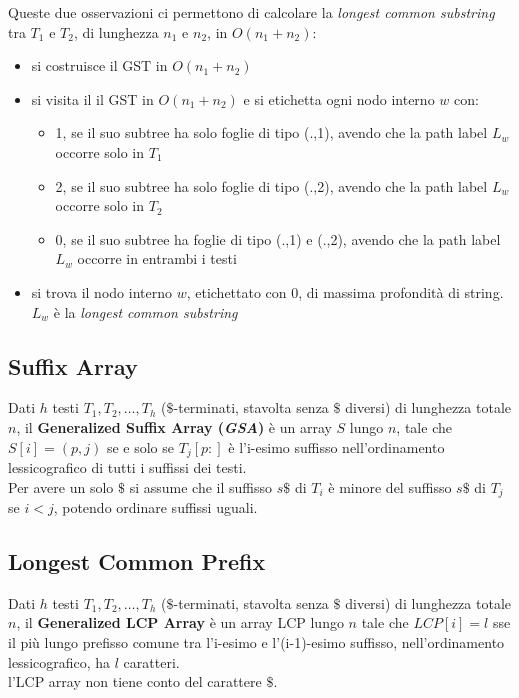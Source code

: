 \documentclass[a4paper,12pt, oneside]{book}
\begin{document}
Queste due osservazioni ci permettono di calcolare la \textit{longest common
  substring} tra $T_1$ e $T_2$, di lunghezza $n_1$ e $n_2$, in $O(n_1+n_2)$:
\begin{itemize}
  \item si costruisce il GST in $O(n_1+n_2)$
  \item si visita il il GST in $O(n_1+n_2)$ e si etichetta ogni nodo interno $w$
  con:
  \begin{itemize}
    \item 1, se il suo subtree ha solo foglie di tipo (.,1), avendo che la path
    label $L_w$ occorre solo in $T_1$
    \item 2, se il suo subtree ha solo foglie di tipo (.,2), avendo che la path
    label $L_w$ occorre solo in $T_2$ 
    \item 0, se il suo subtree ha foglie di tipo (.,1) e (.,2), avendo che la
    path label $L_w$ occorre in entrambi i testi
  \end{itemize}
  \item si trova il nodo interno $w$, etichettato con $0$, di massima profondità
  di string. $L_w$ è la \textit{longest common substring}
\end{itemize}
\subsection{Suffix Array}
\begin{definizione}
  Dati $h$ testi $ T_1,  T_2,  \ldots, T_h$ ($\$$-terminati, stavolta senza $\$$
  diversi) di lunghezza totale $n$, il
  \textbf{Generalized Suffix  Array (\textit{GSA})} è un array $S$ lungo $n$,
  tale che $S[i] = (p,j)$ se e solo se $T_j[p:]$ è l’i-esimo suffisso
  nell’ordinamento lessicografico di tutti i suffissi dei testi.  \\
  Per avere un solo $\$$ si assume che il suffisso $s\$$ di $T_i$ è minore del
  suffisso $s\$$ di $T_j$ se $i<j$, potendo ordinare suffissi uguali.
\end{definizione}
\subsection{Longest Common Prefix}
\begin{definizione}
  Dati $h$ testi $ T_1,  T_2,  \ldots, T_h$ ($\$$-terminati, stavolta senza $\$$
  diversi) di lunghezza totale $n$, il \textbf{Generalized LCP Array} è un array
  LCP lungo $n$ tale che $LCP[i]=l$ sse il più lungo prefisso comune tra
  l'i-esimo e l'(i-1)-esimo suffisso, nell'ordinamento lessicografico, ha $l$
  caratteri. \\
  l'LCP array non tiene conto del carattere $\$$.
\end{definizione}
\end{document}
